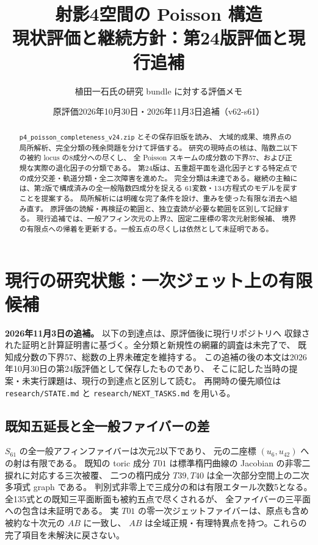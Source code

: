 \documentclass[11pt,a4paper]{ltjsarticle}
\theoremstyle{remark}\newtheorem{remark}[proposition]{注意}
\begin{document}
\title{射影4空間の Poisson 構造\\\large 現状評価と継続方針：第24版評価と現行追補}
\author{植田一石氏の研究 bundle に対する評価メモ}
\date{原評価2026年10月30日・2026年11月3日追補（v62-s61）}
\maketitle
\begin{abstract}
\texttt{p4\_poisson\_completeness\_v24.zip} とその保存旧版を読み、
大域的成果、境界点の局所解析、完全分類の残余問題を分けて評価する。
研究の現時点の核は、階数二以下の被約 locus の8成分への尽くし、
全 Poisson スキームの成分数の下界57、および正規な実際の退化因子の分類である。
第24版は、五重超平面を退化因子とする特定点での成分交差・軌道分類・全二次障害を進めた。
完全分類は未達である。継続の主軸には、第2版で構成済みの全一般階数四成分を捉える
61変数・134方程式のモデルを戻すことを提案する。
局所解析には明確な完了条件を設け、重みを使った有限な消去へ組み直す。
原評価の読解・再検証の範囲と、独立査読が必要な範囲を区別して記録する。
現行追補では、一般アフィン次元の上界2、固定二座標の零次元射影候補、
境界の有限点への帰着を更新する。一般五点の尽くしは依然として未証明である。
\end{abstract}
\tableofcontents

\section{現行の研究状態：一次ジェット上の有限候補}
\label{sec:current-continuation}
\textbf{2026年11月3日の追補。} 以下の到達点は、原評価後に現行リポジトリへ
収録された証明と計算証明書に基づく。全分類と新規性の網羅的調査は未完了で、
既知成分数の下界57、総数の上界未確定を維持する。
この追補の後の本文は2026年10月30日の第24版評価として保存したものであり、
そこに記した当時の提案・未実行課題は、現行の到達点と区別して読む。
再開時の優先順位は \texttt{research/STATE.md} と
\texttt{research/NEXT\_TASKS.md} を用いる。

\subsection{既知五延長と全一般ファイバーの差}
$S_{61}$ の全一般アフィンファイバーは次元2以下であり、
元の二座標 $(u_6,u_{42})$ への射は有限である。
既知の toric 成分 $T01$ は標準楕円曲線の Jacobian の非零二捩れに対応する三次被覆、
二つの楕円成分 $T39,T40$ は全一次部分空間上の二次多項式 graph である。
判別式非零上で三成分の和は有限エタール次数5となる。
全135式との既知三平面断面も被約五点で尽くされるが、
全ファイバーの三平面への包含は未証明である。
実 $T01$ の零一次ジェットファイバーは、原点も含め被約な十次元の $AB$ に一致し、
$AB$ は全域正規・有理特異点を持つ。これらの完了項目を未解決に戻さない。
\end{document}
